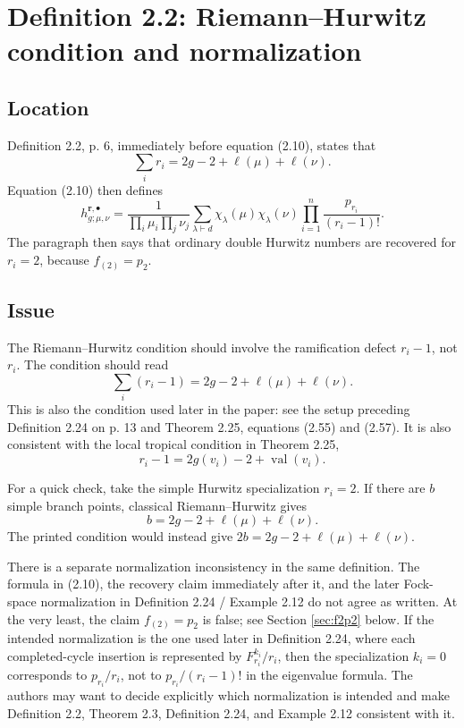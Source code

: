 \documentclass[11pt]{article}
\newcommand{\ellp}{\ell}
\begin{document}
\section{Definition 2.2: Riemann--Hurwitz condition and normalization}

\subsection*{Location}
Definition 2.2, p. 6, immediately before equation (2.10), states that
\[
   \sum_i r_i = 2g-2+\ellp(\mu)+\ellp(\nu).
\]
Equation (2.10) then defines
\[
   h^{\mathbf r,\bullet}_{g;\mu,\nu}
   = \frac{1}{\prod_i\mu_i\prod_j\nu_j}
     \sum_{\lambda\vdash d}\chi_\lambda(\mu)\chi_\lambda(\nu)
     \prod_{i=1}^n \frac{p_{r_i}}{(r_i-1)!}.
\]
The paragraph then says that ordinary double Hurwitz numbers are recovered for $r_i=2$, because $f_{(2)}=p_2$.

\subsection*{Issue}
The Riemann--Hurwitz condition should involve the ramification defect $r_i-1$, not $r_i$.  The condition should read
\begin{equation}\label{eq:RH-correct}
   \sum_i (r_i-1)=2g-2+\ellp(\mu)+\ellp(\nu).
\end{equation}
This is also the condition used later in the paper: see the setup preceding Definition 2.24 on p. 13 and Theorem 2.25, equations (2.55) and (2.57).  It is also consistent with the local tropical condition in Theorem 2.25,
\[
   r_i-1 = 2g(v_i)-2+\operatorname{val}(v_i).
\]

For a quick check, take the simple Hurwitz specialization $r_i=2$.  If there are $b$ simple branch points, classical Riemann--Hurwitz gives
\[
   b=2g-2+\ellp(\mu)+\ellp(\nu).
\]
The printed condition would instead give $2b=2g-2+\ellp(\mu)+\ellp(\nu)$.

There is a separate normalization inconsistency in the same definition.  The formula in (2.10), the recovery claim immediately after it, and the later Fock-space normalization in Definition 2.24 / Example 2.12 do not agree as written.  At the very least, the claim $f_{(2)}=p_2$ is false; see Section \ref{sec:f2p2} below.  If the intended normalization is the one used later in Definition 2.24, where each completed-cycle insertion is represented by $F^{k_i}_{r_i}/r_i$, then the specialization $k_i=0$ corresponds to $p_{r_i}/r_i$, not to $p_{r_i}/(r_i-1)!$ in the eigenvalue formula.  The authors may want to decide explicitly which normalization is intended and make Definition 2.2, Theorem 2.3, Definition 2.24, and Example 2.12 consistent with it.
\end{document}
